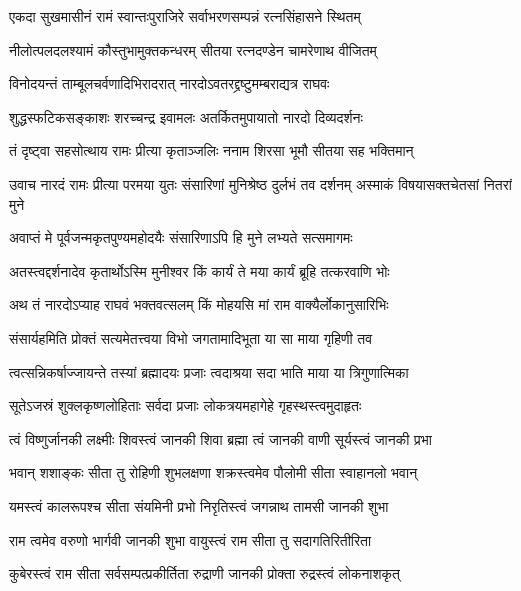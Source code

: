 




\twolineshloka
{एकदा सुखमासीनं रामं स्वान्तःपुराजिरे}
{सर्वाभरणसम्पन्नं रत्नसिंहासने स्थितम्} %

\twolineshloka
{नीलोत्पलदलश्यामं कौस्तुभामुक्तकन्धरम्}
{सीतया रत्नदण्डेन चामरेणाथ वीजितम्} %

\twolineshloka
{विनोदयन्तं ताम्बूलचर्वणादिभिरादरात्}
{नारदोऽवतरद्द्रष्टुमम्बराद्यत्र राघवः} %

\twolineshloka
{शुद्धस्फटिकसङ्काशः शरच्चन्द्र इवामलः}
{अतर्कितमुपायातो नारदो दिव्यदर्शनः} %

\twolineshloka
{तं दृष्ट्वा सहसोत्थाय रामः प्रीत्या कृताञ्जलिः}
{ननाम शिरसा भूमौ सीतया सह भक्तिमान्} %

\threelineshloka
{उवाच नारदं रामः प्रीत्या परमया युतः}
{संसारिणां मुनिश्रेष्ठ दुर्लभं तव दर्शनम्}
{अस्माकं विषयासक्तचेतसां नितरां मुने} %

\twolineshloka
{अवाप्तं मे पूर्वजन्मकृतपुण्यमहोदयैः}
{संसारिणाऽपि हि मुने लभ्यते सत्समागमः} %

\twolineshloka
{अतस्त्वद्दर्शनादेव कृतार्थोऽस्मि मुनीश्वर}
{किं कार्यं ते मया कार्यं ब्रूहि तत्करवाणि भोः} %

\twolineshloka
{अथ तं नारदोऽप्याह राघवं भक्तवत्सलम्}
{किं मोहयसि मां राम वाक्यैर्लोकानुसारिभिः} %

\twolineshloka
{संसार्यहमिति प्रोक्तं सत्यमेतत्त्वया विभो}
{जगतामादिभूता या सा माया गृहिणी तव} %

\twolineshloka
{त्वत्सन्निकर्षाज्जायन्ते तस्यां ब्रह्मादयः प्रजाः}
{त्वदाश्रया सदा भाति माया या त्रिगुणात्मिका} %

\twolineshloka
{सूतेऽजस्रं शुक्लकृष्णलोहिताः सर्वदा प्रजाः}
{लोकत्रयमहागेहे गृहस्थस्त्वमुदाहृतः} %

\twolineshloka
{त्वं विष्णुर्जानकी लक्ष्मीः शिवस्त्वं जानकी शिवा}
{ब्रह्मा त्वं जानकी वाणी सूर्यस्त्वं जानकी प्रभा} %

\twolineshloka
{भवान् शशाङ्कः सीता तु रोहिणी शुभलक्षणा}
{शक्रस्त्वमेव पौलोमी सीता स्वाहानलो भवान्} %

\twolineshloka
{यमस्त्वं कालरूपश्च सीता संयमिनी प्रभो}
{निरृतिस्त्वं जगन्नाथ तामसी जानकी शुभा} %

\twolineshloka
{राम त्वमेव वरुणो भार्गवी जानकी शुभा}
{वायुस्त्वं राम सीता तु सदागतिरितीरिता} %

\twolineshloka
{कुबेरस्त्वं राम सीता सर्वसम्पत्प्रकीर्तिता}
{रुद्राणी जानकी प्रोक्ता रुद्रस्त्वं लोकनाशकृत्} %

